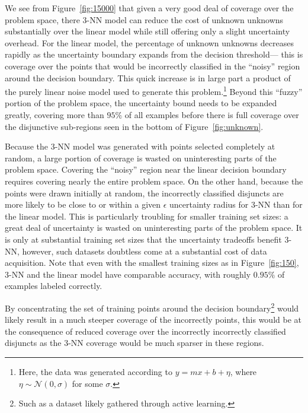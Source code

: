 We see from Figure~\ref{fig:15000} that given a very good deal of coverage over the problem space, there $3$-NN model can reduce the cost of unknown unknowns substantially over the linear model while still offering only a slight uncertainty overhead. For the linear model, the percentage of unknown unknowns decreases rapidly as the uncertainty boundary expands from the decision threshold--- this is coverage over the points that would be incorrectly classified in the ``noisy'' region around the decision boundary. This quick increase is in large part a product of the purely linear noise model used to generate this problem.\footnote{Here, the data was generated according to $y = mx + b + \eta$, where $\eta \sim \mathcal{N}(0, \sigma)$ for some $\sigma$.} Beyond this ``fuzzy'' portion of the problem space, the uncertainty bound needs to be expanded greatly, covering more than $95\%$ of all examples before there is full coverage over the disjunctive sub-regions seen in the bottom of Figure~\ref{fig:unknown}.  

Because the $3$-NN model was generated with points selected completely at random, a large portion of coverage is wasted on uninteresting parts of the problem space. Covering the ``noisy'' region near the linear decision boundary requires covering nearly the entire problem space. On the other hand, because the points were drawn initially at random, the incorrectly classified disjuncts are more likely to be close to or within a given $\epsilon$ uncertainty radius for $3$-NN than for the linear model. This is particularly troubling for smaller training set sizes: a great deal of uncertainty is wasted on uninteresting parts of the problem space. It is only at substantial training set sizes that the uncertainty tradeoffs benefit $3$-NN, however, such datasets doubtless come at a substantial cost of data acquisition. Note that even with the smallest training sizes as in Figure~\ref{fig:150}, $3$-NN and the linear model have comparable accuracy, with roughly $0.95\%$ of examples labeled correctly.

By concentrating the set of training points around the decision boundary\footnote{Such as a dataset likely gathered through active learning.} would likely result in a much steeper coverage of the incorrectly points, this would be at the consequence of reduced coverage over the incorrectly incorrectly classified disjuncts as the $3$-NN coverage would be much sparser in these regions.  

